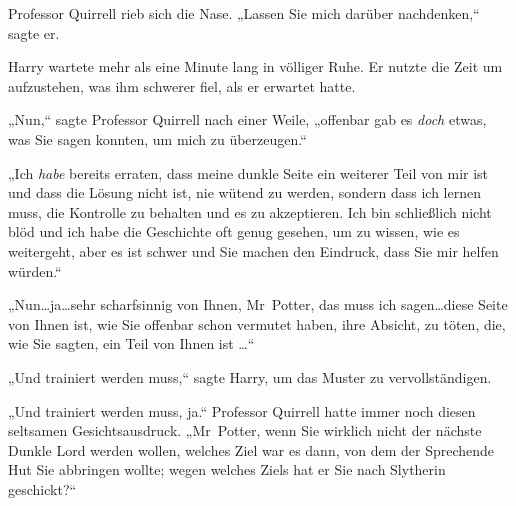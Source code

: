 Professor Quirrell rieb sich die Nase. „Lassen Sie mich darüber nachdenken,“ sagte er.

Harry wartete mehr als eine Minute lang in völliger Ruhe. Er nutzte die Zeit um aufzustehen, was ihm schwerer fiel, als er erwartet hatte.

„Nun,“ sagte Professor Quirrell nach einer Weile, „offenbar gab es \emph{doch} etwas, was Sie sagen konnten, um mich zu überzeugen.“

„Ich \emph{habe} bereits erraten, dass meine dunkle Seite ein weiterer Teil von mir ist und dass die Lösung nicht ist, nie wütend zu werden, sondern dass ich lernen muss, die Kontrolle zu behalten und es zu akzeptieren. Ich bin schließlich nicht blöd und ich habe die Geschichte oft genug gesehen, um zu wissen, wie es weitergeht, aber es ist schwer und Sie machen den Eindruck, dass Sie mir helfen würden.“

„Nun…ja…sehr scharfsinnig von Ihnen, Mr~Potter, das muss ich sagen…diese Seite von Ihnen ist, wie Sie offenbar schon vermutet haben, ihre Absicht, zu töten, die, wie Sie sagten, ein Teil von Ihnen ist …“

„Und trainiert werden muss,“ sagte Harry, um das Muster zu vervollständigen.

„Und trainiert werden muss, ja.“ Professor Quirrell hatte immer noch diesen seltsamen Gesichtsausdruck. „Mr~Potter, wenn Sie wirklich nicht der nächste Dunkle Lord werden wollen, welches Ziel war es dann, von dem der Sprechende Hut Sie abbringen wollte; wegen welches Ziels hat er Sie nach Slytherin geschickt?“

